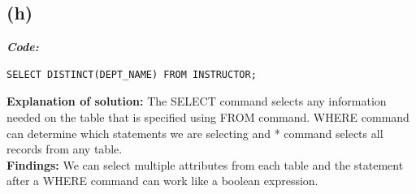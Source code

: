\documentclass[a4paper, left=1in, right=1in,12pt]{article}
\begin{document}
\subsection*{(h)}
\textbf{\textit{\large Code:}}
\begin{verbatim}
SELECT DISTINCT(DEPT_NAME) FROM INSTRUCTOR;
\end{verbatim}

\textbf{Explanation of solution: }The SELECT command selects any information needed on the table that is specified using FROM command. WHERE command can determine which statements we are selecting and * command selects all records from any table.\\
\newline
\textbf{Findings: }We can select multiple attributes from each table and the statement after a WHERE command can work like a boolean expression.
\end{document}
